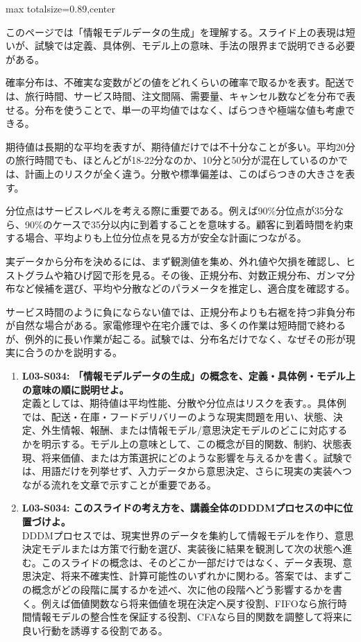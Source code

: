 \begin{minipage}[t]{0.58\textwidth}
\begin{adjustbox}{max totalsize={\textwidth}{0.89\textheight},center}
\begin{minipage}{\textwidth}\scriptsize
{}このページでは「情報モデルデータの生成」を理解する。スライド上の表現は短いが、試験では定義、具体例、モデル上の意味、手法の限界まで説明できる必要がある。\par
確率分布は、不確実な変数がどの値をどれくらいの確率で取るかを表す。配送では、旅行時間、サービス時間、注文間隔、需要量、キャンセル数などを分布で表せる。分布を使うことで、単一の平均値ではなく、ばらつきや極端な値も考慮できる。\par
期待値は長期的な平均を表すが、期待値だけでは不十分なことが多い。平均20分の旅行時間でも、ほとんどが18-22分なのか、10分と50分が混在しているのかでは、計画上のリスクが全く違う。分散や標準偏差は、このばらつきの大きさを表す。\par
分位点はサービスレベルを考える際に重要である。例えば90\%分位点が35分なら、90\%のケースで35分以内に到着することを意味する。顧客に到着時間を約束する場合、平均よりも上位分位点を見る方が安全な計画につながる。\par
実データから分布を決めるには、まず観測値を集め、外れ値や欠損を確認し、ヒストグラムや箱ひげ図で形を見る。その後、正規分布、対数正規分布、ガンマ分布など候補を選び、平均や分散などのパラメータを推定し、適合度を確認する。\par
サービス時間のように負にならない値では、正規分布よりも右裾を持つ非負分布が自然な場合がある。家電修理や在宅介護では、多くの作業は短時間で終わるが、例外的に長い作業が起こる。試験では、分布名だけでなく、なぜその形が現実に合うのかを説明する。\par{}\begin{enumerate}\item \textbf{L03-S034: 「情報モデルデータの生成」の概念を、定義・具体例・モデル上の意味の順に説明せよ。}\\定義としては、期待値は平均性能、分散や分位点はリスクを表す。。具体例では、配送・在庫・フードデリバリーのような現実問題を用い、状態、決定、外生情報、報酬、または情報モデル/意思決定モデルのどこに対応するかを明示する。モデル上の意味として、この概念が目的関数、制約、状態表現、将来価値、または方策選択にどのような影響を与えるかを書く。試験では、用語だけを列挙せず、入力データから意思決定、さらに現実の実装へつながる流れを文章で示すことが重要である。\item \textbf{L03-S034: このスライドの考え方を、講義全体のDDDMプロセスの中に位置づけよ。}\\DDDMプロセスでは、現実世界のデータを集約して情報モデルを作り、意思決定モデルまたは方策で行動を選び、実装後に結果を観測して次の状態へ進む。このスライドの概念は、そのどこか一部だけではなく、データ表現、意思決定、将来不確実性、計算可能性のいずれかに関わる。答案では、まずこの概念がどの段階に属するかを述べ、次に他の段階へどう影響するかを書く。例えば価値関数なら将来価値を現在決定へ戻す役割、FIFOなら旅行時間情報モデルの整合性を保証する役割、CFAなら目的関数を調整して将来に良い行動を誘導する役割である。\end{enumerate}

\end{minipage}
\end{adjustbox}
\end{minipage}
